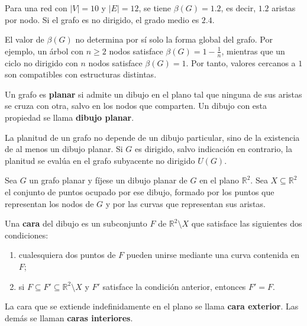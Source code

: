             \begin{ejemplo}
                Para una red con $|V| = 10$ y $|E| = 12$, se tiene $\beta(G)=1.2$, es decir, $1.2$ aristas por nodo. Si el grafo es no dirigido, el grado medio es $2.4$.
            \end{ejemplo}

            \begin{observacion}
                El valor de $\beta(G)$ no determina por sí solo la forma global del grafo. Por ejemplo, un árbol con $n\ge 2$ nodos satisface $\beta(G)=1-\frac{1}{n}$, mientras que un ciclo no dirigido con $n$ nodos satisface $\beta(G)=1$. Por tanto, valores cercanos a $1$ son compatibles con estructuras distintas.
            \end{observacion}

            \begin{definicion}
                Un grafo es \textbf{planar} si admite un dibujo en el plano tal que ninguna de sus aristas se cruza con otra, salvo en los nodos que comparten. Un dibujo con esta propiedad se llama \textbf{dibujo planar}.
            \end{definicion}

            \begin{observacion}
                La planitud de un grafo no depende de un dibujo particular, sino de la existencia de al menos un dibujo planar. Si $G$ es dirigido, salvo indicación en contrario, la planitud se evalúa en el grafo subyacente no dirigido $U(G)$.
            \end{observacion}

            \begin{definicion}
                Sea $G$ un grafo planar y fíjese un dibujo planar de $G$ en el plano $\mathbb{R}^2$. Sea $X\subseteq \mathbb{R}^2$ el conjunto de puntos ocupado por ese dibujo, formado por los puntos que representan los nodos de $G$ y por las curvas que representan sus aristas.

                Una \textbf{cara} del dibujo es un subconjunto $F$ de $\mathbb{R}^2\setminus X$ que satisface las siguientes dos condiciones:
                \begin{enumerate}
                    \item cualesquiera dos puntos de $F$ pueden unirse mediante una curva contenida en $F$;
                    \item si $F\subseteq F'\subseteq \mathbb{R}^2\setminus X$ y $F'$ satisface la condición anterior, entonces $F'=F$.
                \end{enumerate}
                La cara que se extiende indefinidamente en el plano se llama \textbf{cara exterior}. Las demás se llaman \textbf{caras interiores}.
            \end{definicion}

